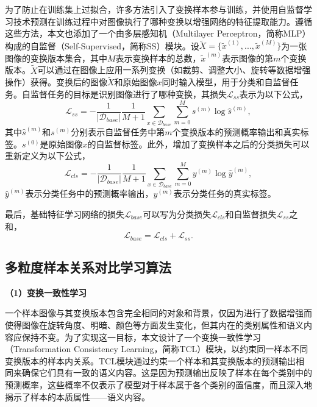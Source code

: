 为了防止在训练集上过拟合，许多方法\cite{IER, PAL, SSLforFSL}引入了变换样本参与训练，并使用自监督学习技术预测在训练过程中对图像执行了哪种变换以增强网络的特征提取能力。遵循这些方法，本文也添加了一个由多层感知机（Multilayer Perceptron，简称MLP）构成的自监督（Self-Supervised，简称SS）模块。设$\widetilde{X}=\{\widetilde{x}^{(1)}, ..., \widetilde{x}^{(M)}\}$为一张图像的变换版本集合，其中$M$表示变换样本的总数，$\widetilde{x}^{(m)}$表示图像的第$m$个变换版本。$\widetilde{X}$可以通过在图像上应用一系列变换（如裁剪、调整大小、旋转等数据增强操作）获得。变换后的图像$\widetilde{X}$和原始图像$x$同时输入模型，用于分类和自监督任务。自监督任务的目标是识别图像进行了哪种变换，其损失$\mathcal{L}_{ss}$表示为以下公式，
\begin{equation}
\label{equation3:3.3}
  \mathcal{L}_{ss} = - \frac{1}{|\mathcal{D}_{base}|}\frac{1}{M+1}\sum_{x \in \mathcal{D}_{base}}\sum_{m=0}^{M}s^{(m)}\log\widehat{s}^{(m)},
\end{equation}
其中$\widehat{s}^{(m)}$和$s^{(m)}$分别表示自监督任务中第$m$个变换版本的预测概率输出和真实标签。$s^{(0)}$是原始图像$x$的自监督标签。此外，增加了变换样本之后的分类损失可以重新定义为以下公式，
\begin{equation}
\label{equation3:3.4}
  \mathcal{L}_{cls} = - \frac{1}{|\mathcal{D}_{base}|}\frac{1}{M+1}\sum_{x \in \mathcal{D}_{base}}\sum_{m=0}^{M}y^{(m)}\log\widehat{y}^{(m)},
\end{equation}
$\widehat{y}^{(m)}$表示分类任务中的预测概率输出，$y^{(m)}$表示分类任务的真实标签。

最后，基础特征学习网络的损失$\mathcal{L}_{base}$可以写为分类损失$\mathcal{L}_{cls}$和自监督损失$\mathcal{L}_{ss}$之和，
\begin{equation}
\label{equation3:3.5}
  \mathcal{L}_{base} = \mathcal{L}_{cls} + \mathcal{L}_{ss}.
\end{equation}

\subsection[\hspace{-2pt}多粒度样本关系对比学习算法]{{\heiti{} \hspace{-8pt}多粒度样本关系对比学习算法}}\label{section3: 多粒度样本关系对比学习算法}

\textbf{（1）变换一致性学习}

一个样本图像与其变换版本包含完全相同的对象和背景，仅因为进行了数据增强而使得图像在旋转角度、明暗、颜色等方面发生变化，但其内在的类别属性和语义内容应保持不变。为了实现这一目标，本文设计了一个变换一致性学习（Transformation Consistency Learning，简称TCL）模块，以约束同一样本不同变换版本的样本内关系。TCL模块通过约束一个样本和其变换版本的预测输出相同来确保它们具有一致的语义内容。这是因为预测输出反映了样本在每个类别中的预测概率，这些概率不仅表示了模型对于样本属于各个类别的置信度，而且深入地揭示了样本的本质属性——语义内容。

